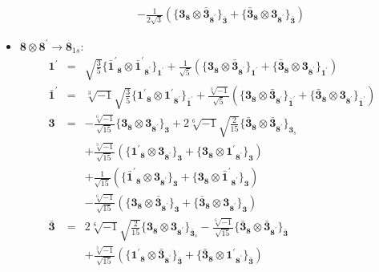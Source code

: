 \documentclass[english]{article}
\newcommand{\subcg}[3]{\big\{ {#1}\otimes{#2}\big\}^{}_{#3}}
\newcommand{\rep}[1]{\mathbf{#1}}
\begin{document}
\begin{itemize}
\begin{eqnarray*}
 & & -\frac{1}{2 \sqrt{3}}\left(\subcg{\rep{3}_{\rep{8}}}{\rep{\bar{3}}_{\rep{8^{\prime}}}}{\rep{\bar{3}}}+\subcg{\rep{\bar{3}}_{\rep{8}}}{\rep{3}_{\rep{8^{\prime}}}}{\rep{\bar{3}}}\right)
\end{eqnarray*}
\item $\rep{8}\otimes\rep{8^{\prime}}\to\rep{8}_{1s}$:
\begin{eqnarray*}
\rep{1^{\prime}} &=& \sqrt{\frac{3}{5}}\subcg{\rep{\bar{1}^{\prime}}_{\rep{8}}}{\rep{\bar{1}^{\prime}}_{\rep{8^{\prime}}}}{\rep{1^{\prime}}}+\frac{1}{\sqrt{5}}\left(\subcg{\rep{3}_{\rep{8}}}{\rep{\bar{3}}_{\rep{8^{\prime}}}}{\rep{1^{\prime}}}+\subcg{\rep{\bar{3}}_{\rep{8}}}{\rep{3}_{\rep{8^{\prime}}}}{\rep{1^{\prime}}}\right)
\\
\rep{\bar{1}^{\prime}} &=& \sqrt[3]{-1} \sqrt{\frac{3}{5}}\subcg{\rep{1^{\prime}}_{\rep{8}}}{\rep{1^{\prime}}_{\rep{8^{\prime}}}}{\rep{\bar{1}^{\prime}}}+\frac{\sqrt[3]{-1}}{\sqrt{5}}\left(\subcg{\rep{3}_{\rep{8}}}{\rep{\bar{3}}_{\rep{8^{\prime}}}}{\rep{\bar{1}^{\prime}}}+\subcg{\rep{\bar{3}}_{\rep{8}}}{\rep{3}_{\rep{8^{\prime}}}}{\rep{\bar{1}^{\prime}}}\right)
\\
\rep{3} &=& -\frac{\sqrt[6]{-1}}{\sqrt{15}}\subcg{\rep{3}_{\rep{8}}}{\rep{3}_{\rep{8^{\prime}}}}{\rep{3}}+2 \sqrt[6]{-1} \sqrt{\frac{2}{15}}\subcg{\rep{\bar{3}}_{\rep{8}}}{\rep{\bar{3}}_{\rep{8^{\prime}}}}{\rep{3}_{s}} \\ 
 & & +\frac{\sqrt[3]{-1}}{\sqrt{15}}\left(\subcg{\rep{1^{\prime}}_{\rep{8}}}{\rep{3}_{\rep{8^{\prime}}}}{\rep{3}}+\subcg{\rep{3}_{\rep{8}}}{\rep{1^{\prime}}_{\rep{8^{\prime}}}}{\rep{3}}\right) \\ 
 & & +\frac{1}{\sqrt{15}}\left(\subcg{\rep{\bar{1}^{\prime}}_{\rep{8}}}{\rep{3}_{\rep{8^{\prime}}}}{\rep{3}}+\subcg{\rep{3}_{\rep{8}}}{\rep{\bar{1}^{\prime}}_{\rep{8^{\prime}}}}{\rep{3}}\right) \\ 
 & & -\frac{\sqrt[6]{-1}}{\sqrt{15}}\left(\subcg{\rep{3}_{\rep{8}}}{\rep{\bar{3}}_{\rep{8^{\prime}}}}{\rep{3}}+\subcg{\rep{\bar{3}}_{\rep{8}}}{\rep{3}_{\rep{8^{\prime}}}}{\rep{3}}\right)
\\
\rep{\bar{3}} &=& 2 \sqrt[6]{-1} \sqrt{\frac{2}{15}}\subcg{\rep{3}_{\rep{8}}}{\rep{3}_{\rep{8^{\prime}}}}{\rep{\bar{3}}_{s}}-\frac{\sqrt[6]{-1}}{\sqrt{15}}\subcg{\rep{\bar{3}}_{\rep{8}}}{\rep{\bar{3}}_{\rep{8^{\prime}}}}{\rep{\bar{3}}} \\ 
 & & +\frac{\sqrt[3]{-1}}{\sqrt{15}}\left(\subcg{\rep{1^{\prime}}_{\rep{8}}}{\rep{\bar{3}}_{\rep{8^{\prime}}}}{\rep{\bar{3}}}+\subcg{\rep{\bar{3}}_{\rep{8}}}{\rep{1^{\prime}}_{\rep{8^{\prime}}}}{\rep{\bar{3}}}\right) \\ 

\end{eqnarray*}
\end{itemize}
\end{document}
